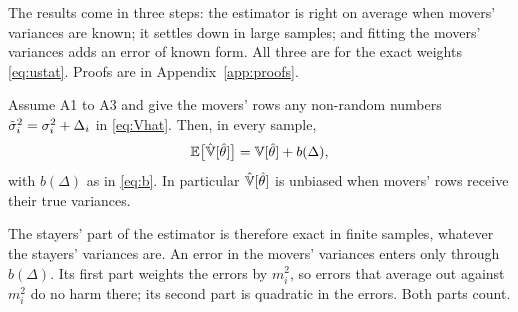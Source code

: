 The results come in three steps: the estimator is right on average when movers' variances are known; it
settles down in large samples; and fitting the movers' variances adds an error of known form. All three are for
the exact weights \eqref{eq:ustat}. Proofs are in Appendix~\ref{app:proofs}.

\begin{proposition}\label{prop:mean}
Assume A1 to A3 and give the movers' rows any non-random numbers $\tilde\sigma_i^2=\sigma_i^2+\Delta_i$ in
\eqref{eq:Vhat}. Then, in every sample,
\[
\mathbb{E}\big[\hat{\mathbb{V}}[\hat\theta]\big]=\mathbb{V}[\hat\theta]+b(\Delta),
\]
with $b(\Delta)$ as in \eqref{eq:b}. In particular $\hat{\mathbb{V}}[\hat\theta]$ is unbiased when movers' rows receive
their true variances.
\end{proposition}

The stayers' part of the estimator is therefore exact in finite samples, whatever the stayers' variances are.
An error in the movers' variances enters only through $b(\Delta)$. Its first part weights the errors by
$m_i^2$, so errors that average out against $m_i^2$ do no harm there; its second part is quadratic in the
errors. Both parts count.

